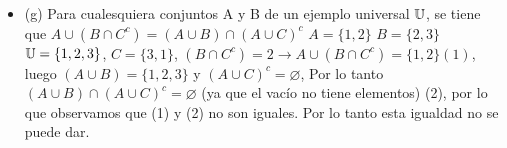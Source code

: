 \begin{itemize}
	\item (g) Para cualesquiera conjuntos A y B de un ejemplo universal $\mathbb{U}$, se tiene que $A \cup (B \cap C^c) = (A \cup B) \cap (A \cup C)^c$\newline
	$A = \{1,2\}$ $B = \{2,3\}$ $\mathbb{U} = \{1,2,3\}$, $C = \{3,1\}$, \newline
	$(B \cap C^c)=2 \rightarrow A \cup (B \cap C^c)  = \{1,2\} (1)$, luego $(A \cup B) = \{1,2,3\}$ y $(A \cup C)^c = \varnothing$, \newline
	Por lo tanto $(A \cup B)\cap (A \cup C)^c = \varnothing$ (ya que el vacío no tiene elementos) (2), por lo que observamos que (1) y (2) no son iguales.\newline
	Por lo tanto esta igualdad no se puede dar.
\end{itemize}